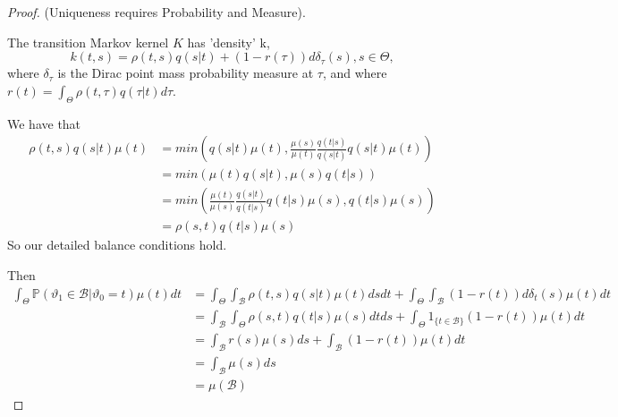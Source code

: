 \documentclass[a4paper]{article}
\begin{document}
 \begin{proof}
	 (Uniqueness requires Probability and Measure).

	 The transition Markov kernel $K$ has 'density' k,
	 \[
		 k(t,s) = \rho(t,s)q(s|t) + (1-r(\tau))d\delta_{\tau}(s), s \in \Theta
	 ,\]
	 where $\delta_{\tau}$ is the Dirac point mass probability measure at $\tau$, and where $r(t) = \int_{\Theta} \rho(t, \tau)q(\tau|t) d\tau$.

	 We have that
	 \begin{align*}
		 \rho(t,s)q(s|t)\mu(t) &= min\left( q(s|t)\mu(t), \frac{\mu(s)}{\mu(t)} \frac{q(t|s)}{q(s|t)} q(s|t)\mu(t) \right)  \\
		 &= min\left( \mu(t)q(s|t), \mu(s) q(t|s) \right)  \\
		 &= min\left( \frac{\mu(t)}{\mu(s)} \frac{q(s|t)}{q(t|s)} q(t|s)\mu(s), q(t|s)\mu(s) \right)  \\ 
		 &= \rho(s,t)q(t|s)\mu(s)
	 \end{align*}
	So our detailed balance conditions hold.

	Then
	\begin{align*}
		\int_{\Theta} \mathbb{P}\left( \vartheta_1 \in \mathcal{B} | \vartheta_0 =t \right) \mu(t) dt &= \int_{\Theta}\int_{\mathcal{B}} \rho(t,s)q(s|t)\mu(t) dsdt + \int_{\Theta}\int_{\mathcal{B}} (1-r(t))d\delta_{t}(s)\mu(t)dt \\
		&= \int_{\mathcal{B}}\int_{\Theta} \rho(s,t)q(t|s)\mu(s) dt ds + \int_{\Theta} 1_{\{t\in \mathcal{B}\} } (1-r(t))\mu(t) dt \\
		&= \int_{\mathcal{B}} r(s) \mu(s) ds + \int_{\mathcal{B}} (1-r(t)) \mu(t) dt \\
		&= \int_{\mathcal{B}} \mu(s) ds \\
		&= \mu(\mathcal{B})
	\end{align*}
\end{proof}
\end{document}
